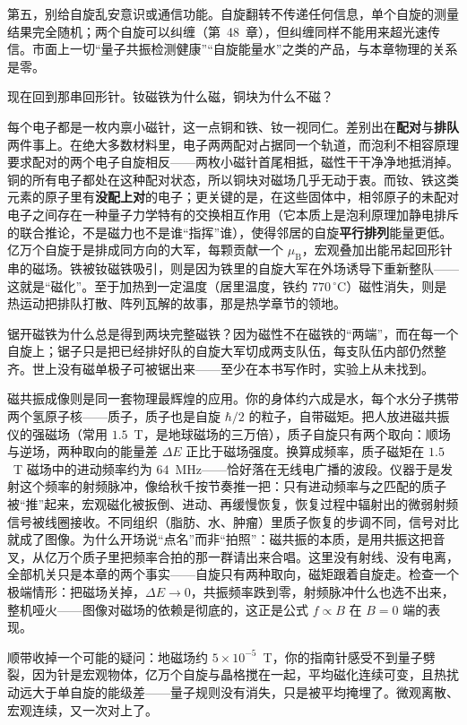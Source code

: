 第五，别给自旋乱安意识或通信功能。自旋翻转不传递任何信息，单个自旋的测量结果完全随机；两个自旋可以纠缠（第~48~章），但纠缠同样不能用来超光速传信。市面上一切“量子共振检测健康”“自旋能量水”之类的产品，与本章物理的关系是零。


现在回到那串回形针。钕磁铁为什么磁，铜块为什么不磁？

每个电子都是一枚内禀小磁针，这一点铜和铁、钕一视同仁。差别出在\textbf{配对}与\textbf{排队}两件事上。在绝大多数材料里，电子两两配对占据同一个轨道，而泡利不相容原理要求配对的两个电子自旋相反——两枚小磁针首尾相抵，磁性干干净净地抵消掉。铜的所有电子都处在这种配对状态，所以铜块对磁场几乎无动于衷。而钕、铁这类元素的原子里有\textbf{没配上对}的电子；更关键的是，在这些固体中，相邻原子的未配对电子之间存在一种量子力学特有的交换相互作用（它本质上是泡利原理加静电排斥的联合推论，不是磁力也不是谁“指挥”谁），使得邻居的自旋\textbf{平行排列}能量更低。亿万个自旋于是排成同方向的大军，每颗贡献一个 $\mu_{\mathrm B}$，宏观叠加出能吊起回形针串的磁场。铁被钕磁铁吸引，则是因为铁里的自旋大军在外场诱导下重新整队——这就是“磁化”。至于加热到一定温度（居里温度，铁约 $770\,^\circ$C）磁性消失，则是热运动把排队打散、阵列瓦解的故事，那是热学章节的领地。

锯开磁铁为什么总是得到两块完整磁铁？因为磁性不在磁铁的“两端”，而在每一个自旋上；锯子只是把已经排好队的自旋大军切成两支队伍，每支队伍内部仍然整齐。世上没有磁单极子可被锯出来——至少在本书写作时，实验上从未找到。

磁共振成像则是同一套物理最辉煌的应用。你的身体约六成是水，每个水分子携带两个氢原子核——质子，质子也是自旋 $\hbar/2$ 的粒子，自带磁矩。把人放进磁共振仪的强磁场（常用 $1.5$~T，是地球磁场的三万倍），质子自旋只有两个取向：顺场与逆场，两种取向的能量差 $\Delta E$ 正比于磁场强度。换算成频率，质子磁矩在 $1.5$~T 磁场中的进动频率约为 $64$~MHz——恰好落在无线电广播的波段。仪器于是发射这个频率的射频脉冲，像给秋千按节奏推一把：只有进动频率与之匹配的质子被“推”起来，宏观磁化被扳倒、进动、再缓慢恢复，恢复过程中辐射出的微弱射频信号被线圈接收。不同组织（脂肪、水、肿瘤）里质子恢复的步调不同，信号对比就成了图像。为什么开场说“点名”而非“拍照”：磁共振的本质，是用共振这把音叉，从亿万个质子里把频率合拍的那一群请出来合唱。这里没有射线、没有电离，全部机关只是本章的两个事实——自旋只有两种取向，磁矩跟着自旋走。检查一个极端情形：把磁场关掉，$\Delta E\to0$，共振频率跌到零，射频脉冲什么也选不出来，整机哑火——图像对磁场的依赖是彻底的，这正是公式 $f\propto B$ 在 $B=0$ 端的表现。

顺带收掉一个可能的疑问：地磁场约 $5\times10^{-5}$~T，你的指南针感受不到量子劈裂，因为针是宏观物体，亿万个自旋与晶格搅在一起，平均磁化连续可变，且热扰动远大于单自旋的能级差——量子规则没有消失，只是被平均掩埋了。微观离散、宏观连续，又一次对上了。

